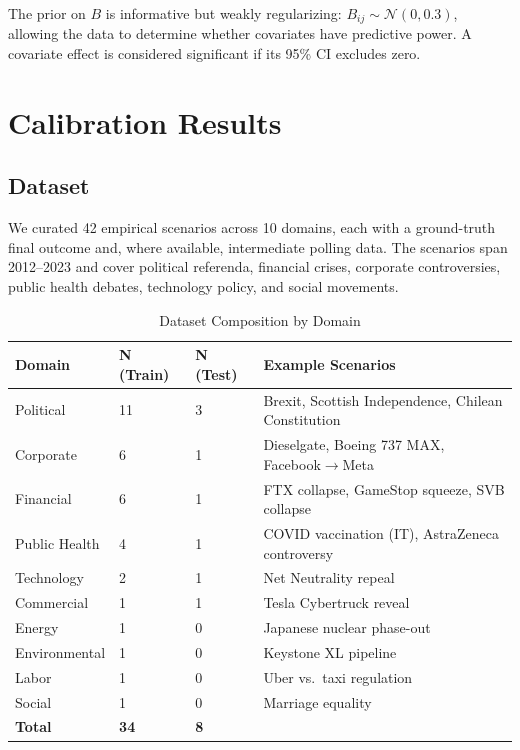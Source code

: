 \documentclass[12pt]{article}
\begin{document}
The prior on $B$ is informative but weakly regularizing: $B_{ij} \sim \mathcal{N}(0, 0.3)$, allowing the data to determine whether covariates have predictive power. A covariate effect is considered significant if its 95\% CI excludes zero.

\section{Calibration Results}
\label{sec:results}

\subsection{Dataset}

We curated 42 empirical scenarios across 10 domains, each with a ground-truth final outcome and, where available, intermediate polling data. The scenarios span 2012--2023 and cover political referenda, financial crises, corporate controversies, public health debates, technology policy, and social movements.

\begin{table}[H]
\centering
\caption{Dataset Composition by Domain}
\label{tab:dataset}
\begin{tabular}{llll}
\toprule
Domain & N (Train) & N (Test) & Example Scenarios \\
\midrule
Political & 11 & 3 & Brexit, Scottish Independence, Chilean Constitution \\
Corporate & 6 & 1 & Dieselgate, Boeing 737 MAX, Facebook$\to$Meta \\
Financial & 6 & 1 & FTX collapse, GameStop squeeze, SVB collapse \\
Public Health & 4 & 1 & COVID vaccination (IT), AstraZeneca controversy \\
Technology & 2 & 1 & Net Neutrality repeal \\
Commercial & 1 & 1 & Tesla Cybertruck reveal \\
Energy & 1 & 0 & Japanese nuclear phase-out \\
Environmental & 1 & 0 & Keystone XL pipeline \\
Labor & 1 & 0 & Uber vs.\ taxi regulation \\
Social & 1 & 0 & Marriage equality \\
\midrule
\textbf{Total} & \textbf{34} & \textbf{8} & \\
\bottomrule
\end{tabular}
\end{table}
\end{document}
